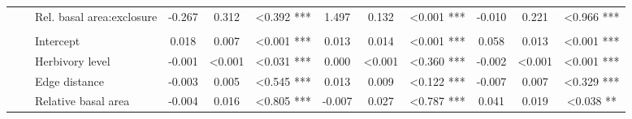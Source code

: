 \documentclass[b5paper,10pt]{book} %
\begin{document}
\begin{sidewaystable}
\begin{center}
\begin{footnotesize}
\begin{tabular}{c c l c c c c c c c c c}
		\multirow{6}{*}{} & \multirow{6}{*}{} & Rel. basal area:exclosure & -0.267 & 0.312 & \color{white}\textless\color{black}0.392 \color{white}***\color{black} & 1.497 & 0.132 & \textless0.001 *** & -0.010 & 0.221 & \color{white}\textless\color{black}0.966 \color{white}***\color{black} \\
		\multirow{5}{*}{\rotatebox{90}{\textbf{Sapling}}} & \multirow{5}{*}{\rotatebox{90}{\textbf{growth}}} & & & & & & & & & & \\
		\multirow{5}{*}{} & \multirow{5}{*}{} & Intercept & 0.018 & 0.007 & \textless0.001 *** & 0.013 & 0.014 & \textless0.001 *** & 0.058 & 0.013 & \textless0.001 ***\\
		\multirow{5}{*}{} & \multirow{5}{*}{} & Herbivory level & -0.001 & \textless0.001 & \color{white}\textless\color{black}0.031 *\color{white}**\color{black} & 0.000 & \textless0.001 & \color{white}\textless\color{black}0.360 \color{white}***\color{black} & -0.002 & \textless0.001 & \color{white}\textless\color{black}0.001 **\color{white}*\color{black} \\
		\multirow{5}{*}{} & \multirow{5}{*}{} & Edge distance & -0.003 & 0.005 & \color{white}\textless\color{black}0.545 \color{white}***\color{black} & 0.013 & 0.009 & \color{white}\textless\color{black}0.122 \color{white}***\color{black} & -0.007 & 0.007 & \color{white}\textless\color{black}0.329 \color{white}***\color{black} \\
		\multirow{5}{*}{} & \multirow{5}{*}{} & Relative basal area & -0.004 & 0.016 & \color{white}\textless\color{black}0.805 \color{white}***\color{black} & -0.007 & 0.027 & \color{white}\textless\color{black}0.787 \color{white}***\color{black} & 0.041 & 0.019 & \color{white}\textless\color{black}0.038 \color{white}**\color{black} \\
	      \bottomrule
	    \end{tabular}
	\end{footnotesize}
	  \end{center}
	\end{sidewaystable}
\end{document}
